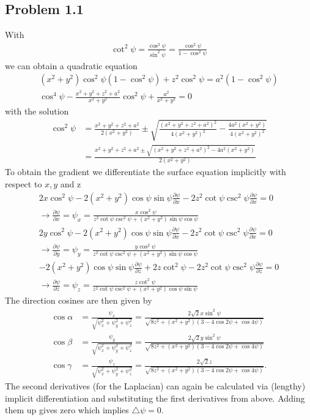 \documentclass[../main.tex]{subfiles}
\begin{document}
\subsection{Problem 1.1}
With
\begin{align}
    \cot^2\psi=\frac{\cos^2\psi}{\sin^2\psi}=\frac{\cos^2\psi}{1-\cos^2\psi}
\end{align}
we can obtain a quadratic equation
\begin{align}
    (x^2+y^2)\cos^2\psi(1-\cos^2\psi)+z^2\cos^2\psi=a^2(1-\cos^2\psi)\\
    \cos^4\psi-\frac{x^2+y^2+z^2+a^2}{x^2+y^2}\cos^2\psi+\frac{a^2}{x^2+y^2}=0
\end{align}
with the solution
\begin{align}
    \cos^2\psi
    &=\frac{x^2+y^2+z^2+a^2}{2(x^2+y^2)}\pm\sqrt{ \frac{(x^2+y^2+z^2+a^2)^2}{4(x^2+y^2)^2}-\frac{4a^2(x^2+y^2)}{4(x^2+y^2)^2}  }\\
    &=\frac{x^2+y^2+z^2+a^2\pm\sqrt{ (x^2+y^2+z^2+a^2)^2-4a^2(x^2+y^2)}}{2(x^2+y^2)}
\end{align}
To obtain the gradient we differentiate the surface equation implicitly with respect to $x,y$ and z
\begin{align}
    2x\cos^2\psi-2(x^2+y^2)\cos\psi\sin\psi\frac{\partial\psi}{\partial x}-2z^2\cot\psi\csc^2\psi\frac{\partial\psi}{\partial x}=0\\
    \rightarrow\frac{\partial\psi}{\partial x}=\psi_x=\frac{x\cos^2\psi}{z^2\cot\psi\csc^2\psi+(x^2+y^2)\sin\psi\cos\psi}\\
    2y\cos^2\psi-2(x^2+y^2)\cos\psi\sin\psi\frac{\partial\psi}{\partial x}-2z^2\cot\psi\csc^2\psi\frac{\partial\psi}{\partial x}=0\\
    \rightarrow\frac{\partial\psi}{\partial y}=\psi_y=\frac{y\cos^2\psi}{z^2\cot\psi\csc^2\psi+(x^2+y^2)\sin\psi\cos\psi}\\
    -2(x^2+y^2)\cos\psi\sin\psi\frac{\partial\psi}{\partial z}+2z\cot^2\psi-2z^2\cot\psi\csc^2\psi\frac{\partial\psi}{\partial z}=0\\
     \rightarrow\frac{\partial\psi}{\partial z}=\psi_z=\frac{z\cot^2\psi}{z^2\cot\psi\csc^2\psi + (x^2+y^2)\cos\psi\sin\psi}
\end{align}
The direction cosines are then given by
\begin{align}
    \cos\alpha&=\frac{\psi_x}{\sqrt{\psi_x^2+\psi_y^2+\psi_z^2}}=\frac{2\sqrt{2}x\sin^2\psi}{\sqrt{8z^2+(x^2+y^2)(3-4\cos2\psi+\cos4\psi)}}\\
    \cos\beta&=\frac{\psi_y}{\sqrt{\psi_x^2+\psi_y^2+\psi_z^2}}=\frac{2\sqrt{2}y\sin^2\psi}{\sqrt{8z^2+(x^2+y^2)(3-4\cos2\psi+\cos4\psi)}}\\
    \cos\gamma&=\frac{\psi_z}{\sqrt{\psi_x^2+\psi_y^2+\psi_z^2}}=\frac{2\sqrt{2}z}{\sqrt{8z^2+(x^2+y^2)(3-4\cos2\psi+\cos4\psi)}}.
\end{align}
The second derivatives (for the Laplacian) can again be calculated via (lengthy) implicit differentiation and substituting the first derivatives from above. Adding them up gives zero which implies $\triangle\psi=0$.
\end{document}
